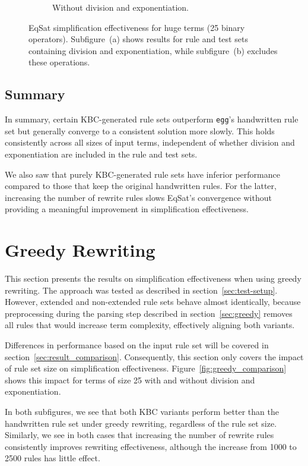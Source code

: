 \begin{figure}[h]
\begin{subfigure}[t]{0.48\textwidth}
		\caption{Without division and exponentiation.}
		\label{fig:eqsat_huge_no_div}
	\end{subfigure}
	\caption{
		EqSat simplification effectiveness for huge terms (25 binary operators).
		Subfigure~(a) shows results for rule and test sets containing division and exponentiation, 
		while subfigure~(b) excludes these operations.
	}
	\label{fig:eqsat_huge_comparison}
\end{figure}

\FloatBarrier
\subsection{Summary}
In summary, certain KBC-generated rule sets outperform \texttt{egg}'s handwritten rule set but generally converge to a consistent solution more slowly. This holds consistently across all sizes of input terms, independent of whether division and exponentiation are included in the rule and test sets. 

We also saw that purely KBC-generated rule sets have inferior performance compared to those that keep the original handwritten rules. For the latter, increasing the number of rewrite rules slows EqSat’s convergence without providing a meaningful improvement in simplification effectiveness.

\section{Greedy Rewriting}
\label{sec:greedy_results}

This section presents the results on simplification effectiveness when using greedy rewriting. The approach was tested as described in section~\ref{sec:test-setup}. However, extended and non-extended rule sets behave almost identically, because preprocessing during the parsing step described in section~\ref{sec:greedy} removes all rules that would increase term complexity, effectively aligning both variants.

Differences in performance based on the input rule set will be covered in section~\ref{sec:result_comparison}. Consequently, this section only covers the impact of rule set size on simplification effectiveness. Figure~\ref{fig:greedy_comparison} shows this impact for terms of size 25 with and without division and exponentiation.

In both subfigures, we see that both KBC variants perform better than the handwritten rule set under greedy rewriting, regardless of the rule set size. Similarly, we see in both cases that increasing the number of rewrite rules consistently improves rewriting effectiveness, although the increase from 1000 to 2500 rules has little effect.

